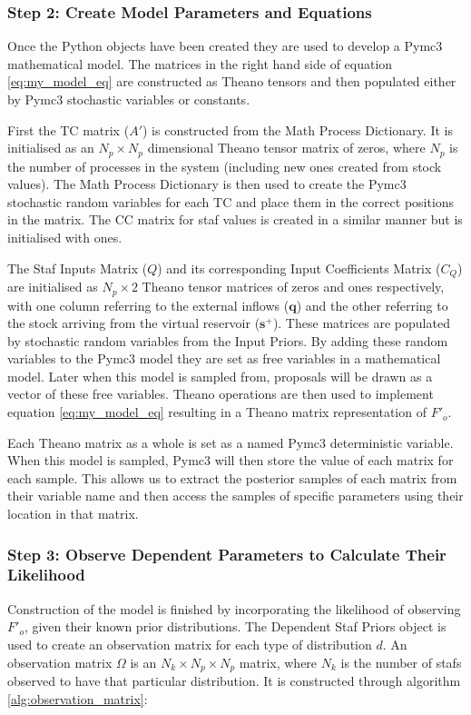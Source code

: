 \documentclass[ %
                    author={Tom Jager},
                supervisor={Dr. Daniel Schien},
                    degree={MEng},
                     title={A Bayesian Inference Engine for Calibrating Uncertainty over UMIS Structured MFA Systems},
                  subtitle={},
                      type={research},
                      year={2019} ]{dissertation}
\begin{document}
\subsubsection{Step 2: Create Model Parameters and Equations}
Once the Python objects have been created they are used to develop a Pymc3 mathematical model. The matrices in the right hand side of equation \ref{eq:my_model_eq} are constructed as Theano tensors and then populated either by Pymc3 stochastic variables or constants.

First the TC matrix ($A'$) is constructed from the Math Process Dictionary. It is initialised as an $N_p \times N_p$ dimensional Theano tensor matrix of zeros, where $N_p$ is the number of processes in the system (including new ones created from stock values). The Math Process Dictionary is then used to create the Pymc3 stochastic random variables for each TC and place them in the correct positions in the matrix. The CC matrix for staf values is created in a similar manner but is initialised with ones.

The Staf Inputs Matrix ($Q$) and its corresponding Input Coefficients Matrix ($C_Q$) are initialised as $N_p \times 2$ Theano tensor matrices of zeros and ones respectively, with one column referring to the external inflows ($\bm{q}$) and the other referring to the stock arriving from the virtual reservoir ($\bm{s^+}$). These matrices are populated by stochastic random variables from the Input Priors. By adding these random variables to the Pymc3 model they are set as free variables in a mathematical model. Later when this model is sampled from, proposals will be drawn as a vector of these free variables. Theano operations are then used to implement equation \ref{eq:my_model_eq} resulting in a Theano matrix representation of $F'_o$.

Each Theano matrix as a whole is set as a named Pymc3 deterministic variable. When this model is sampled, Pymc3 will then store the value of each matrix for each sample. This allows us to extract the posterior samples of each matrix from their variable name and then access the samples of specific parameters using their location in that matrix.

\subsubsection{Step 3: Observe Dependent Parameters to Calculate Their Likelihood}
Construction of the model is finished by incorporating the likelihood of observing $F'_o$, given their known prior distributions. The Dependent Staf Priors object is used to create an observation matrix for each type of distribution $d$. An observation matrix $\Omega$ is an ${N_k \times N_p \times N_p}$ matrix, where $N_k$ is the number of stafs observed to have that particular distribution. It is constructed through algorithm \ref{alg:observation_matrix}:
\end{document}
